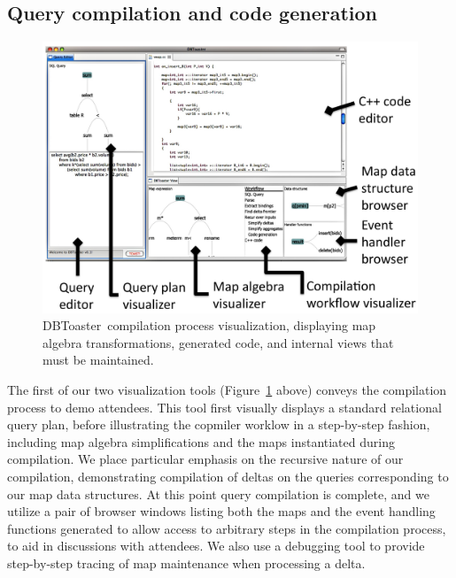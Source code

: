 \documentclass{vldb}
\newcommand{\comment}[1]{}
\newcommand{\compiler}{DBToaster}
\begin{document}
\subsection{Query compilation and code generation}

\begin{figure}[tb]
\begin{center}
\includegraphics[scale=0.088]{figures/dbt-gui}
\end{center}
\caption{\compiler\ compilation process visualization, displaying map algebra
transformations, generated code, and internal views that must be maintained.}
\label{fig:compilegui}
\end{figure}

The first of our two visualization tools (Figure~\ref{fig:compilegui} above)
conveys the compilation process to demo attendees. This tool first visually
displays a standard relational query plan, before illustrating the copmiler
worklow in a step-by-step fashion, including map algebra simplifications and the
maps instantiated during compilation. We place particular emphasis on the
recursive nature of our compilation, demonstrating compilation of deltas on the
queries corresponding to our map data structures. At this point query compilation
is complete, and we utilize a pair of browser windows listing both the maps and
the event handling functions generated to allow access to arbitrary steps in the
compilation process, to aid in discussions with attendees. We also use a
debugging tool to provide step-by-step tracing of map maintenance when
processing a delta.
\comment{ Depending on the
demonstration progress, we may additionally include an example of a
JIT-compilation of the example query to demonstrate the potential for a limited
degree of adaptivity during query execution.
}
\end{document}
